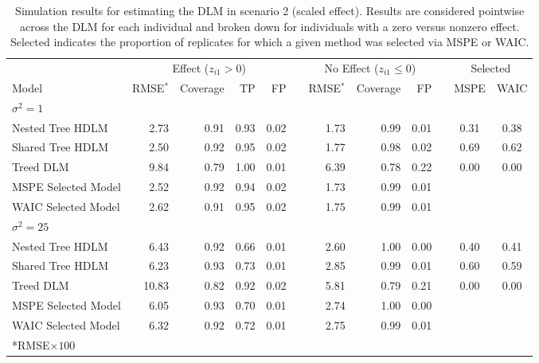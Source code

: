 \documentclass[12pt]{article}
\begin{document}
\begin{table}[!ht]
 \scriptsize
    \centering
    \caption{Simulation results for estimating the DLM in scenario 2 (scaled effect). Results are considered pointwise across the DLM for each individual and broken down for individuals with a zero versus nonzero effect. Selected indicates the proportion of replicates for which a given method was selected via MSPE or WAIC.}\vspace{6pt}
    \label{tab:scen2_res}
    \begin{tabular}{lrrrrrrrrrcc}
        \toprule[2pt]
        &\multicolumn{4}{c}{Effect ($z_{i1}>0$)}&&\multicolumn{3}{c}{No Effect ($z_{i1}\leq0$)}&&\multicolumn{2}{c}{Selected}\\
        \cmidrule(lr){2-5} \cmidrule(lr){7-9} \cmidrule(lr){11-12}
        Model & RMSE$^*$ & Coverage & TP & FP & \phantom{a} &RMSE$^*$ & Coverage & FP && MSPE & WAIC\\
        \midrule
        \multicolumn{9}{l}{$\sigma^2=1$}\\
      Nested Tree HDLM & 2.73 & 0.91 & 0.93 & 0.02 &  & 1.73 & 0.99 & 0.01 &  & 0.31 & 0.38\\
      Shared Tree HDLM & 2.50 & 0.92 & 0.95 & 0.02 &  & 1.77 & 0.98 & 0.02 &  & 0.69 & 0.62\\
             Treed DLM & 9.84 & 0.79 & 1.00 & 0.01 &  & 6.39 & 0.78 & 0.22 &  & 0.00 & 0.00\\
\addlinespace
MSPE Selected Model & 2.52 & 0.92 & 0.94 & 0.02 &  & 1.73 & 0.99 & 0.01 &  \\
WAIC Selected Model & 2.62 & 0.91 & 0.95 & 0.02 &  & 1.75 & 0.99 & 0.01 &  \\
        \midrule
        
        
        \multicolumn{9}{l}{$\sigma^2=25$}\\
              Nested Tree HDLM & 6.43 & 0.92 & 0.66 & 0.01 &  & 2.60 & 1.00 & 0.00 &  & 0.40 & 0.41\\
      Shared Tree HDLM & 6.23 & 0.93 & 0.73 & 0.01 &  & 2.85 & 0.99 & 0.01 &  & 0.60 & 0.59\\
            Treed DLM & 10.83 & 0.82 & 0.92 & 0.02 &  & 5.81 & 0.79 & 0.21 &  & 0.00 & 0.00\\
\addlinespace
MSPE Selected Model & 6.05 & 0.93 & 0.70 & 0.01 &  & 2.74 & 1.00 & 0.00 &  \\
WAIC Selected Model & 6.32 & 0.92 & 0.72 & 0.01 &  & 2.75 & 0.99 & 0.01 &  \\
        
        
        \bottomrule[2pt]
        \multicolumn{9}{l}{*RMSE$\times100$}\\
    \end{tabular}
\end{table}
\end{document}
